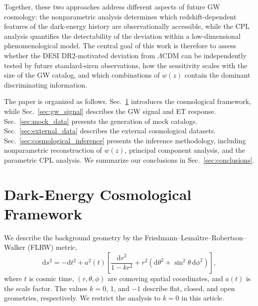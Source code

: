 \documentclass[
  aps,
  prd,
  twocolumn,
  nofootinbib,
  superscriptaddress,
  floatfix,
  longbibliography
]{revtex4-2}
\newcommand{\dd}{\mathrm{d}}
\begin{document}
Together, these two approaches address different aspects of future GW
cosmology: the nonparametric analysis determines which redshift-dependent
features of the dark-energy history are observationally accessible, while the
CPL analysis quantifies the detectability of the deviation within a
low-dimensional phenomenological model. The central goal of this work is
therefore to assess whether the DESI DR2-motivated deviation from $\Lambda$CDM
can be independently tested by future standard-siren observations, how the
sensitivity scales with the size of the GW catalog, and which combinations of
$w(z)$ contain the dominant discriminating information.

The paper is organized as follows. Sec.~\ref{sec:de_framework} introduces
the cosmological framework, while Sec.~\ref{sec:gw_signal} describes the GW
signal and ET response. Sec.~\ref{sec:mock_data} presents the generation of
mock catalogs. Sec.~\ref{sec:external_data} describes the external cosmological
datasets. Sec.~\ref{sec:cosmological_inference} presents the inference
methodology, including nonparametric reconstruction of $w(z)$, principal
component analysis, and the parametric CPL analysis. We summarize our
conclusions in Sec.~\ref{sec:conclusions}.




\section{Dark-Energy Cosmological Framework}
\label{sec:de_framework}

We describe the background geometry by the
Friedmann--Lema\^{\i}tre--Robertson--Walker (FLRW) metric,
\begin{equation}
\dd s^2 = -\dd t^2 + a^2(t)\left[\frac{\dd r^2}{1-k r^2}+r^2\left(\dd\theta^2+\sin^2\theta\,\dd\phi^2\right)\right],
\end{equation}
where $t$ is cosmic time, $(r,\theta,\phi)$ are comoving spatial
coordinates, and $a(t)$ is the scale factor. The values $k=0$, 1, and
$-1$ describe flat, closed, and open geometries, respectively. We restrict
the analysis to $k=0$ in this article.
\end{document}
